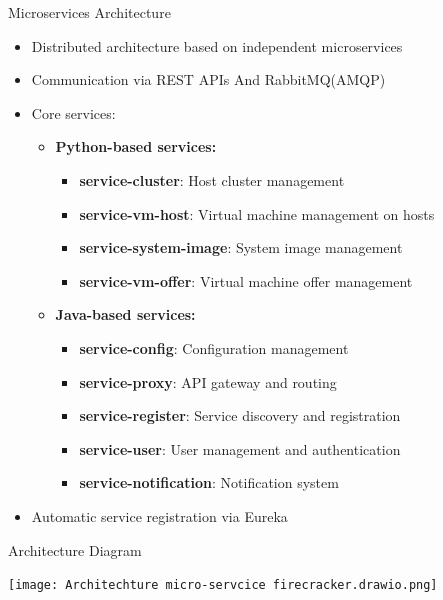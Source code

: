 \documentclass{beamer}
\begin{document}
\begin{frame}{Microservices Architecture}
  \begin{itemize}
    \item Distributed architecture based on independent microservices
    \item Communication via REST APIs And RabbitMQ(AMQP)
    \item Core services:
      \begin{itemize}
        \item \textbf{Python-based services:}
          \begin{itemize}
            \item \textbf{service-cluster}: Host cluster management
            \item \textbf{service-vm-host}: Virtual machine management on hosts
            \item \textbf{service-system-image}: System image management
            \item \textbf{service-vm-offer}: Virtual machine offer management
          \end{itemize}
        \item \textbf{Java-based services:}
          \begin{itemize}
            \item \textbf{service-config}: Configuration management
            \item \textbf{service-proxy}: API gateway and routing
            \item \textbf{service-register}: Service discovery and registration
            \item \textbf{service-user}: User management and authentication
            \item \textbf{service-notification}: Notification system
          \end{itemize}
      \end{itemize}
    \item Automatic service registration via Eureka
  \end{itemize}
\end{frame}

\begin{frame}{Architecture Diagram}
  \begin{center}
    \texttt{[image: Architechture micro-servcice firecracker.drawio.png]}
    \caption{IAASFIRECRACKER Microservices Architecture}
  \end{center}
\end{frame}
\end{document}

